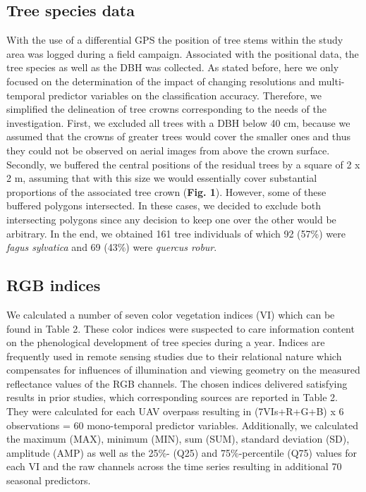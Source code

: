 \documentclass[]{article}
\begin{document}
\hypertarget{tree-species-data}{%
\subsection{Tree species data}\label{tree-species-data}}

With the use of a differential GPS the position of tree stems within the
study area was logged during a field campaign. Associated with the
positional data, the tree species as well as the DBH was collected. As
stated before, here we only focused on the determination of the impact
of changing resolutions and multi-temporal predictor variables on the
classification accuracy. Therefore, we simplified the delineation of
tree crowns corresponding to the needs of the investigation. First, we
excluded all trees with a DBH below 40 cm, because we assumed that the
crowns of greater trees would cover the smaller ones and thus they could
not be observed on aerial images from above the crown surface. Secondly,
we buffered the central positions of the residual trees by a square of 2
x 2 m, assuming that with this size we would essentially cover
substantial proportions of the associated tree crown (\textbf{Fig. 1}).
However, some of these buffered polygons intersected. In these cases, we
decided to exclude both intersecting polygons since any decision to keep
one over the other would be arbitrary. In the end, we obtained 161 tree
individuals of which 92 (57\%) were \emph{fagus sylvatica} and 69 (43\%)
were \emph{quercus robur}.

\hypertarget{rgb-indices}{%
\subsection{RGB indices}\label{rgb-indices}}

We calculated a number of seven color vegetation indices (VI) which can
be found in Table 2. These color indices were suspected to care
information content on the phenological development of tree species
during a year. Indices are frequently used in remote sensing studies due
to their relational nature which compensates for influences of
illumination and viewing geometry on the measured reflectance values of
the RGB channels. The chosen indices delivered satisfying results in
prior studies, which corresponding sources are reported in Table 2. They
were calculated for each UAV overpass resulting in (7VIs+R+G+B) x 6
observations = 60 mono-temporal predictor variables. Additionally, we
calculated the maximum (MAX), minimum (MIN), sum (SUM), standard
deviation (SD), amplitude (AMP) as well as the 25\%- (Q25) and
75\%-percentile (Q75) values for each VI and the raw channels across the
time series resulting in additional 70 seasonal predictors.
\end{document}
